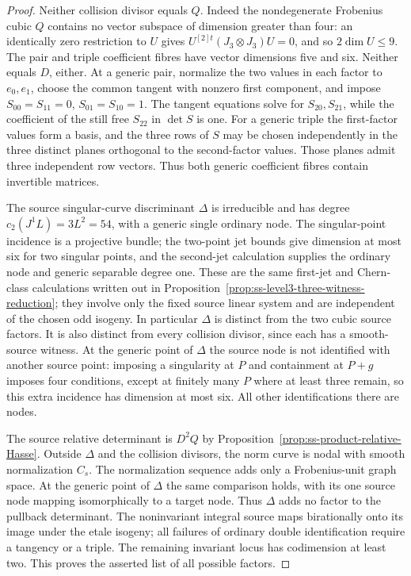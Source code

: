 \begin{proof}
Neither collision divisor equals $Q$. Indeed the nondegenerate
Frobenius cubic $Q$ contains no vector subspace of dimension
greater than four: an identically zero restriction to $U$ gives
$U^{[2]t}(J_3\otimes J_3)U=0$, and so $2\dim U\le9$.
The pair and triple coefficient fibres have vector dimensions
five and six. Neither equals $D$, either. At a generic pair,
normalize the two values in each factor to $e_0,e_1$, choose the
common tangent with nonzero first component, and impose
$S_{00}=S_{11}=0$, $S_{01}=S_{10}=1$.
The tangent equations solve for $S_{20},S_{21}$, while the
coefficient of the still free $S_{22}$ in $\det S$ is one.
For a generic triple the first-factor values form a basis, and
the three rows of $S$ may be chosen independently in the three
distinct planes orthogonal to the second-factor values.
Those planes admit three independent row vectors. Thus both
generic coefficient fibres contain invertible matrices.

The source singular-curve discriminant $\Delta$ is irreducible
and has degree $c_2(J^1L)=3L^2=54$, with a generic single ordinary
node. The singular-point incidence is a projective bundle; the
two-point jet bounds give dimension at most six for two singular
points, and the second-jet calculation supplies the ordinary node
and generic separable degree one. These are the same first-jet
and Chern-class calculations written out in
Proposition~\ref{prop:ss-level3-three-witness-reduction}; they
involve only the fixed source linear system and are independent
of the chosen odd isogeny. In particular $\Delta$ is distinct
from the two cubic source factors. It is also distinct from
every collision divisor, since each has a smooth-source witness.
At the generic point of $\Delta$ the source node is not identified
with another source point: imposing a singularity at $P$ and
containment at $P+g$ imposes four conditions, except at finitely
many $P$ where at least three remain, so this extra incidence has
dimension at most six. All other identifications there are nodes.

The source relative determinant is $D^2Q$ by
Proposition~\ref{prop:ss-product-relative-Hasse}.
Outside $\Delta$ and the collision divisors, the norm curve is
nodal with smooth normalization $C_s$. The normalization sequence
adds only a Frobenius-unit graph space. At the generic point of
$\Delta$ the same comparison holds, with its one source node
mapping isomorphically to a target node. Thus $\Delta$ adds no
factor to the pullback determinant. The noninvariant integral
source maps birationally onto its image under the etale isogeny;
all failures of ordinary double identification require a tangency
or a triple. The remaining invariant locus has codimension at
least two. This proves the asserted list of all possible factors.


\end{proof}
